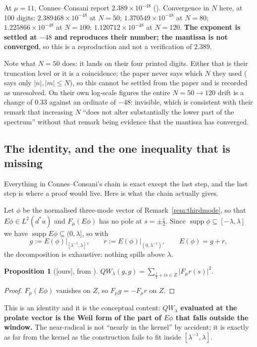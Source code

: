\documentclass[11pt,a4paper]{article}
\theoremstyle{plain}
\newtheorem{proposition}[theorem]{Proposition}
\theoremstyle{definition}
\theoremstyle{remark}
\newcommand{\ours}{{\normalfont\sffamily\footnotesize[ours]}}
\newcommand{\R}{\mathbb{R}}
\newcommand{\Z}{\mathbb{Z}}
\newcommand{\Q}{\mathbb{Q}}
\newcommand{\A}{\mathbb{A}}
\newcommand{\E}{\mathcal{E}}
\newcommand{\F}{\mathcal{F}}
\newcommand{\QW}{QW}
\newcommand{\file}[1]{\path{#1}}
\def\QW{QW}\def\E{E}\def\F{F}\def\R{R}\def\Q{Q}\def\Z{Z}\def\A{A}%
\begin{document}
At $\mu=11$, Connes--Consani report $2.389\times10^{-48}$ (\file{:178}).
Convergence in $N$ here, at 100 digits: $2.389468\times10^{-48}$ at $N=50$;
$1.370549\times10^{-48}$ at $N=80$; $1.225866\times10^{-48}$ at $N=100$;
$1.120712\times10^{-48}$ at $N=120$.  \textbf{The exponent is settled at $-48$
and reproduces their number; the mantissa is not converged}, so this is a
reproduction and not a verification of $2.389$.

Note what $N=50$ does: it lands on their four printed digits.  Either that is
their truncation level or it is a coincidence; the paper never says which $N$
they used (\file{:210} says only $|n|,|m|\le N$), so this cannot be settled from
the paper and is recorded as unresolved.  On their own log-scale figures the
entire $N=50\to120$ drift is a change of $0.33$ against an ordinate of $-48$:
invisible, which is consistent with their remark that increasing $N$ ``does not
alter substantially the lower part of the spectrum'' without that remark being
evidence that the mantissa has converged.

\subsection{The identity, and the one inequality that is missing}
\label{sec:identity}

Everything in Connes--Consani's chain is exact except the last step, and the
last step is where a proof would live.  Here is what the chain actually gives.

Let $\phi$ be the normalised three-mode vector of Remark~\ref{rem:thirdmode}, so
that $\E\phi\in L^2(d^*u)$ and $\F_\mu(\E\phi)$ has no pole at $s=\pm\tfrac i2$.
Since $\operatorname{supp}\phi\subseteq[-\lambda,\lambda]$ we have
$\operatorname{supp}\E\phi\subseteq(0,\lambda]$, so with
\[
  g:=\E(\phi)\big|_{[\lambda^{-1},\lambda]},\qquad
  r:=\E(\phi)\big|_{(0,\lambda^{-1})},\qquad \E(\phi)=g+r,
\]
the decomposition is exhaustive: nothing spills above $\lambda$.

\begin{proposition}[\ours, from \cite{CC2023}]\label{prop:identity}
$\displaystyle \QW_\lambda(g,g)=\sum_{\frac12+is\in Z}\big|\F_\mu r(s)\big|^2 .$
\end{proposition}

\begin{proof}
$\F_\mu(\E\phi)$ vanishes on $Z$, so $\F_\mu g=-\F_\mu r$ on $Z$.
\end{proof}

This is an identity and it is the conceptual content: \textbf{$\QW_\lambda$
evaluated at the prolate vector is the Weil form of the part of $\E\phi$ that
falls outside the window.}  The near-radical is not ``nearly in the kernel'' by
accident; it is exactly as far from the kernel as the construction fails to fit
inside $[\lambda^{-1},\lambda]$.
\end{document}
